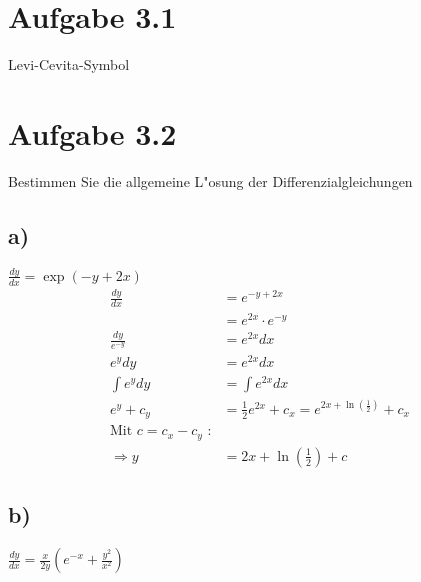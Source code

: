 \documentclass{theozettel}
\begin{document}

\section*{Aufgabe 3.1} Levi-Cevita-Symbol\\


\newpage
\section*{Aufgabe 3.2} Bestimmen Sie die allgemeine L"osung der Differenzialgleichungen\\
\subsection*{a)} $\frac{dy}{dx} = \exp\left(-y+2x\right)$\\
\begin{align*}
					\frac{dy}{dx} 	&= e^{-y+2x}\\
									&= e^{2x}\cdot e^{-y}\\
\frac{dy}{e^{-y}}	&= e^{2x} dx\\
e^y dy  &= e^{2x} dx\\
\int{e^y dy} &= \int{e^{2x} dx}\\
e^y +c_y &= \frac{1}{2} e^{2x} + c_x = e^{2x+ \ln\left(\frac{1}{2}\right)}+c_x\\
\text{Mit }c=c_x-c_y \text{ :}\\
\Rightarrow y&= 2x+ \ln{\left(\frac{1}{2}\right)}+c
\end{align*}
\subsection*{b)}$\frac{dy}{dx} = \frac{x}{2y}\left(e^{-x}+\frac{y^2}{x^2}\right)$\\
\end{document}
